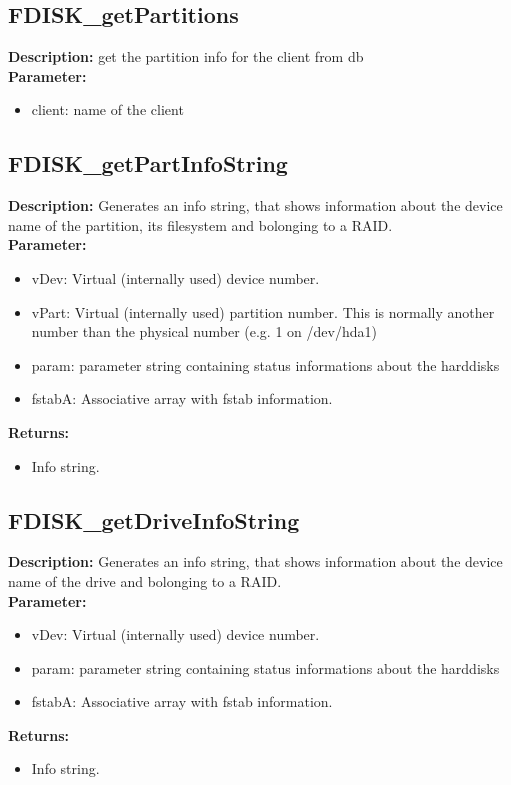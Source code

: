 \subsection{FDISK\_getPartitions}
\textbf{Description:} get the partition info for the client from db\\
\textbf{Parameter:}
\begin{itemize}
\item client: name of the client
\end{itemize}

\subsection{FDISK\_getPartInfoString}
\textbf{Description:} Generates an info string, that shows information about the device name of the partition, its filesystem and bolonging to a RAID.\\
\textbf{Parameter:}
\begin{itemize}
\item vDev: Virtual (internally used) device number.
\item vPart: Virtual (internally used) partition number. This is normally another number than the physical number (e.g. 1 on /dev/hda1)
\item param: parameter string containing status informations about the harddisks
\item fstabA: Associative array with fstab information.
\end{itemize}
\textbf{Returns:}
\begin{itemize}
\item Info string.
\end{itemize}

\subsection{FDISK\_getDriveInfoString}
\textbf{Description:} Generates an info string, that shows information about the device name of the drive and bolonging to a RAID.\\
\textbf{Parameter:}
\begin{itemize}
\item vDev: Virtual (internally used) device number.
\item param: parameter string containing status informations about the harddisks
\item fstabA: Associative array with fstab information.
\end{itemize}
\textbf{Returns:}
\begin{itemize}
\item Info string.
\end{itemize}

